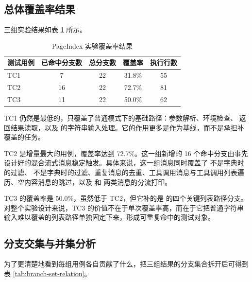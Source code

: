 \subsection{总体覆盖率结果}

三组实验结果如表 \ref{tab:pageindex-coverage} 所示。

\begin{table}[htbp]
    \centering
    \caption{PageIndex 实验覆盖率结果}
    \label{tab:pageindex-coverage}
    \begin{tabular}{lcccc}
        \toprule
        测试用例 & 已命中分支数 & 总分支数 & 覆盖率 & 执行行数 \\
        \midrule
        TC1 & 7 & 22 & 31.8\% & 55 \\
        TC2 & 16 & 22 & 72.7\% & 81 \\
        TC3 & 11 & 22 & 50.0\% & 62 \\
        \bottomrule
    \end{tabular}
\end{table}

TC1 仍然是最低的，只覆盖了普通模式下的基础路径：参数解析、环境检查、 返回结果读取，以及  的字符串输入处理。它的作用更多是作为基线，而不是承担补覆盖的任务。

TC2 是增量最大的用例，覆盖率达到 72.7\%。这一组新增的 16 个命中分支由事先设计好的混合流式消息稳定触发。具体来说，这一组消息同时覆盖了  不是字典时的过滤、 不是字典时的过滤、重复消息的去重、工具调用消息与工具调用列表遍历、空内容消息的跳过，以及  和  两类消息的分流打印。

TC3 的覆盖率是 50.0\%，虽然低于 TC2，但它补的是  的四个关键列表路径分支。对整个实验设计来说，TC3 的价值不在于单次覆盖率高，而在于它把普通字符串输入难以覆盖的列表路径单独固定下来，形成可重复命中的测试对象。

\subsection{分支交集与并集分析}

为了更清楚地看到每组用例各自贡献了什么，把三组结果的分支集合拆开后可得到表 \ref{tab:branch-set-relation}。

